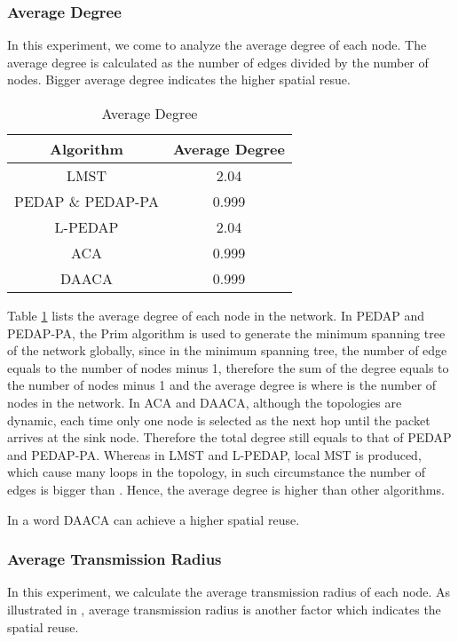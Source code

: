 \documentclass{elsarticle}
\begin{document}
\subsubsection{Average Degree}
In this experiment, we come to analyze the average degree of each node. The average degree is calculated as the number of edges divided by the number of nodes. Bigger average degree indicates the higher spatial resue\cite{label-7}.
\begin{table}[!hbp]
\centering
\caption{Average Degree} \label{AverageDegreeTable}
\begin{tabular}{cc}
\toprule
\textbf{Algorithm} & \textbf{Average Degree} \\
\midrule
LMST & 2.04 \\
PEDAP \& PEDAP-PA & 0.999 \\
L-PEDAP & 2.04 \\
ACA & 0.999 \\
DAACA & 0.999 \\
\bottomrule
\end{tabular}

\end{table}

Table \ref{AverageDegreeTable} lists the average degree of each node in the network. In PEDAP and PEDAP-PA, the Prim algorithm is used to generate the minimum spanning tree of the network globally, since in the minimum spanning tree, the number of edge equals to the number of nodes minus 1, therefore the sum of the degree equals to the number of nodes minus 1 and the average degree is  where  is the number of nodes in the network. In ACA and DAACA, although the topologies are dynamic, each time only one node is selected as the next hop until the packet arrives at the sink node. Therefore the total degree still equals to that of PEDAP and PEDAP-PA. Whereas in LMST and L-PEDAP, local MST is produced, which cause many loops in the topology, in such circumstance the number of edges is bigger than . Hence, the average degree is higher than other algorithms.

In a word DAACA can achieve a higher spatial reuse.

\subsubsection{Average Transmission Radius} \label{AverageTransmissionRadius}
In this experiment, we calculate the average transmission radius of each node. As illustrated in \cite{label-7}, average transmission radius is another factor which indicates the spatial reuse.
\end{document}
